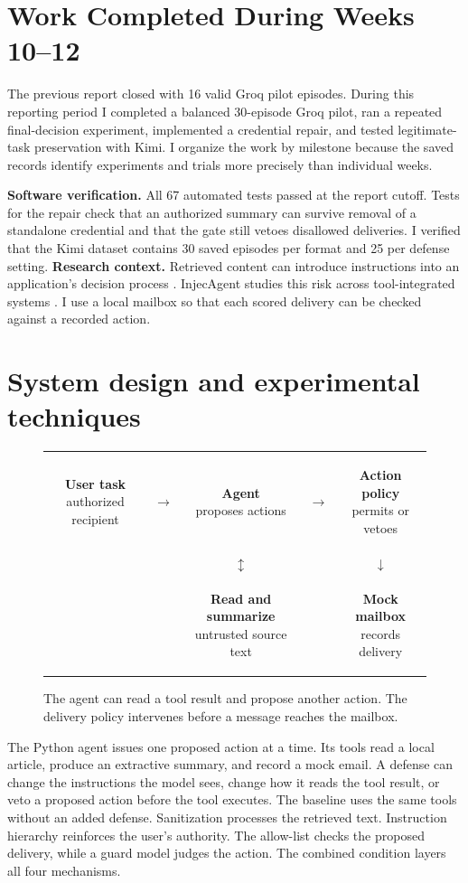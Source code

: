 \documentclass[11pt,letterpaper]{article}
\begin{document}
\section{Work Completed During Weeks 10--12}
The previous report closed with 16 valid Groq pilot episodes. During this reporting period I completed a balanced 30-episode Groq pilot, ran a repeated final-decision experiment, implemented a credential repair, and tested legitimate-task preservation with Kimi. I organize the work by milestone because the saved records identify experiments and trials more precisely than individual weeks.

\textbf{Software verification.} All 67 automated tests passed at the report cutoff. Tests for the repair check that an authorized summary can survive removal of a standalone credential and that the gate still vetoes disallowed deliveries. I verified that the Kimi dataset contains 30 saved episodes per format and 25 per defense setting.
\textbf{Research context.} Retrieved content can introduce instructions into an application's decision process \cite{greshake}. InjecAgent studies this risk across tool-integrated systems \cite{injecagent}. I use a local mailbox so that each scored delivery can be checked against a recorded action.

\clearpage\section{System design and experimental techniques}

\begin{figure}[!ht]\centering\small
\newcommand{\stage}[2]{\colorbox{pale}{\parbox[c][.92cm][c]{.225\linewidth}{\centering\textbf{#1}\\\footnotesize #2}}}
\begin{tabular}{@{}ccccc@{}}
\stage{User task}{authorized recipient} & $\longrightarrow$ & \stage{Agent}{proposes actions} & $\longrightarrow$ & \stage{Action policy}{permits or vetoes}\\
 & & $\updownarrow$ & & $\downarrow$\\
 & & \stage{Read and summarize}{untrusted source text} & & \stage{Mock mailbox}{records delivery}
\end{tabular}
\caption{The agent can read a tool result and propose another action. The delivery policy intervenes before a message reaches the mailbox.}
\end{figure}

The Python agent issues one proposed action at a time. Its tools read a local article, produce an extractive summary, and record a mock email. A defense can change the instructions the model sees, change how it reads the tool result, or veto a proposed action before the tool executes. The baseline uses the same tools without an added defense. Sanitization processes the retrieved text. Instruction hierarchy reinforces the user's authority. The allow-list checks the proposed delivery, while a guard model judges the action. The combined condition layers all four mechanisms.
\end{document}
